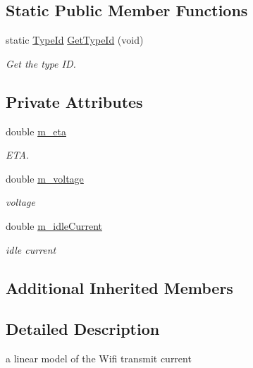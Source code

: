 \subsection*{Static Public Member Functions}
\begin{DoxyCompactItemize}
\item 
static \hyperlink{classns3_1_1TypeId}{Type\+Id} \hyperlink{classns3_1_1LinearWifiTxCurrentModel_ae72c4be07ce37aae16821c2140f376bd}{Get\+Type\+Id} (void)
\begin{DoxyCompactList}\small\item\em Get the type ID. \end{DoxyCompactList}\end{DoxyCompactItemize}
\subsection*{Private Attributes}
\begin{DoxyCompactItemize}
\item 
double \hyperlink{classns3_1_1LinearWifiTxCurrentModel_a20a1e937625160bbeea19c57cfd85e2b}{m\+\_\+eta}
\begin{DoxyCompactList}\small\item\em E\+TA. \end{DoxyCompactList}\item 
double \hyperlink{classns3_1_1LinearWifiTxCurrentModel_ab6d30871bdd27d1e1539c3e40e447339}{m\+\_\+voltage}
\begin{DoxyCompactList}\small\item\em voltage \end{DoxyCompactList}\item 
double \hyperlink{classns3_1_1LinearWifiTxCurrentModel_ac5dd2a8974fa09aa72e7e4b26dee9f94}{m\+\_\+idle\+Current}
\begin{DoxyCompactList}\small\item\em idle current \end{DoxyCompactList}\end{DoxyCompactItemize}
\subsection*{Additional Inherited Members}


\subsection{Detailed Description}
a linear model of the Wifi transmit current 

